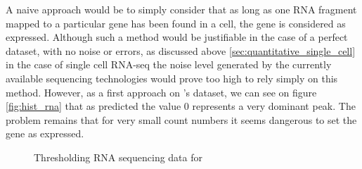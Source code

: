   A naive approach would be to simply consider that as long as one RNA fragment mapped to a particular gene has been found in a cell, the gene is considered as expressed. Although such a method would be justifiable in the case of a perfect dataset, with no noise or errors, as discussed above \ref{sec:quantitative_single_cell} in the case of single cell RNA-seq the noise level generated by the currently available sequencing technologies would prove too high to rely simply on this method. However, as a first approach on \platy{}'s dataset, we can see on figure \ref{fig:hist_rna} that as predicted the value $0$ represents a very dominant peak. The problem remains that for very small count numbers it seems dangerous to set the gene as expressed.\\
  
\begin{figure}[h]
        \myfloatalign
         \quad
        \caption{Thresholding RNA sequencing data for \platy{}}\label{fig:platynereis_single_cell}
\end{figure}
  
